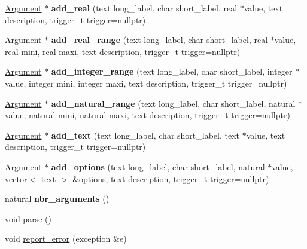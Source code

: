 \begin{DoxyCompactItemize}
\item 
\mbox{\label{classez_1_1arguments_1_1ArgumentParser_a849cbf117f92a755497fb37e206bf320}} 
\hyperlink{classez_1_1arguments_1_1Argument}{Argument} $\ast$ {\bfseries add\+\_\+real} (text long\+\_\+label, char short\+\_\+label, real $\ast$value, text description, trigger\+\_\+t trigger=nullptr)
\item 
\mbox{\label{classez_1_1arguments_1_1ArgumentParser_ac90051ff2c8c2d6195336a733eb9441a}} 
\hyperlink{classez_1_1arguments_1_1Argument}{Argument} $\ast$ {\bfseries add\+\_\+real\+\_\+range} (text long\+\_\+label, char short\+\_\+label, real $\ast$value, real mini, real maxi, text description, trigger\+\_\+t trigger=nullptr)
\item 
\mbox{\label{classez_1_1arguments_1_1ArgumentParser_a28980f736205a085e955715079c82efa}} 
\hyperlink{classez_1_1arguments_1_1Argument}{Argument} $\ast$ {\bfseries add\+\_\+integer\+\_\+range} (text long\+\_\+label, char short\+\_\+label, integer $\ast$value, integer mini, integer maxi, text description, trigger\+\_\+t trigger=nullptr)
\item 
\mbox{\label{classez_1_1arguments_1_1ArgumentParser_acc784dd4d36c9682ee1e7f4d466ba0aa}} 
\hyperlink{classez_1_1arguments_1_1Argument}{Argument} $\ast$ {\bfseries add\+\_\+natural\+\_\+range} (text long\+\_\+label, char short\+\_\+label, natural $\ast$value, natural mini, natural maxi, text description, trigger\+\_\+t trigger=nullptr)
\item 
\mbox{\label{classez_1_1arguments_1_1ArgumentParser_aabc8b35a31dd61bc334ae5d6213730fb}} 
\hyperlink{classez_1_1arguments_1_1Argument}{Argument} $\ast$ {\bfseries add\+\_\+text} (text long\+\_\+label, char short\+\_\+label, text $\ast$value, text description, trigger\+\_\+t trigger=nullptr)
\item 
\mbox{\label{classez_1_1arguments_1_1ArgumentParser_a222f678cf331cc55c463386f1ff52519}} 
\hyperlink{classez_1_1arguments_1_1Argument}{Argument} $\ast$ {\bfseries add\+\_\+options} (text long\+\_\+label, char short\+\_\+label, natural $\ast$value, vector$<$ text $>$ \&options, text description, trigger\+\_\+t trigger=nullptr)
\item 
\mbox{\label{classez_1_1arguments_1_1ArgumentParser_a9b8b290a07eac311665f91851b9d7b3d}} 
natural {\bfseries nbr\+\_\+arguments} ()
\item 
void \hyperlink{classez_1_1arguments_1_1ArgumentParser_a740720f7b71d51c66b2211689cccf595}{parse} ()
\item 
void \hyperlink{classez_1_1arguments_1_1ArgumentParser_a19a161953f44e5f8c02ad53c4f9c660b}{report\+\_\+error} (exception \&e)
\end{DoxyCompactItemize}
